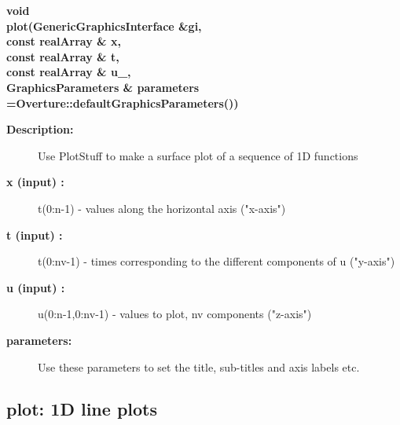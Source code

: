 \begin{flushleft} \textbf{%
void  \\ 
\settowidth{\PlotStuffIncludeArgIndent}{plot(}%
plot(GenericGraphicsInterface \&gi,\\ 
\hspace{\PlotStuffIncludeArgIndent}const realArray \& x, \\ 
\hspace{\PlotStuffIncludeArgIndent}const realArray \& t,\\ 
\hspace{\PlotStuffIncludeArgIndent}const realArray \& u\_, \\ 
GraphicsParameters \& parameters  =Overture::defaultGraphicsParameters())
}\end{flushleft}
\begin{description}
\item[{\bf Description:}] 
    Use PlotStuff to make a surface plot of a sequence of 1D functions
\item[{\bf x (input) :}]  t(0:n-1) - values along the horizontal axis ("x-axis")
\item[{\bf t (input) :}]  t(0:nv-1) - times corresponding to the different components of u ("y-axis")
\item[{\bf u (input) :}]  u(0:n-1,0:nv-1) - values to plot, nv components  ("z-axis")
 
\item[{\bf parameters:}]  Use these parameters to set the title, sub-titles and axis labels etc.
\end{description}
\subsection{plot: 1D line plots}
 
